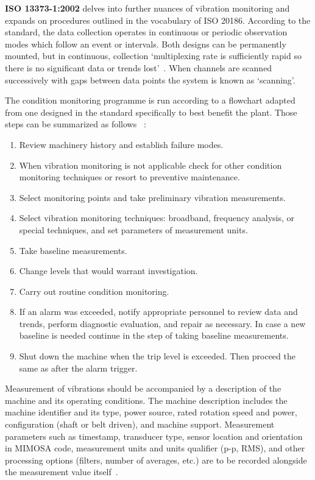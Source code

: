\textbf{ISO 13373-1:2002} delves into further nuances of vibration monitoring and expands on procedures outlined in the vocabulary of ISO 20186. According to the standard, the data collection operates in continuous or periodic observation modes which follow an event or intervals. Both designs can be permanently mounted, but in continuous, collection `multiplexing rate is sufficiently rapid so there is no significant data or trends lost'~\cite{noauthor_iso_2002}.  When channels are scanned successively with gaps between data points the system is known as `scanning'.

The condition monitoring programme is run according to a flowchart adapted from one designed in the standard specifically to best benefit the plant. Those steps can be summarized as follows ~\cite{noauthor_iso_2002}:
\begin{enumerate}
\itemsep0pt
\item Review machinery history and establish failure modes.
\item When vibration monitoring is not applicable check for other condition monitoring techniques or resort to preventive maintenance.
\item Select monitoring points and take preliminary vibration measurements.
\item Select vibration monitoring techniques: broadband, frequency analysis, or special techniques, and set parameters of measurement units.
\item Take baseline measurements.
\item Change levels that would warrant investigation.
\item Carry out routine condition monitoring.
\item If an alarm was exceeded, notify appropriate personnel to review data and trends, perform diagnostic evaluation, and repair as necessary. In case a new baseline is needed continue in the step of taking baseline measurements.
\item Shut down the machine when the trip level is exceeded. Then proceed the same as after the alarm trigger.
\end{enumerate}

Measurement of vibrations should be accompanied by a description of the machine and its operating conditions. The machine description includes the machine identifier and its type, power source, rated rotation speed and power, configuration (shaft or belt driven), and machine support. Measurement parameters such as timestamp, transducer type, sensor location and orientation in MIMOSA code, measurement units and units qualifier (p-p, RMS), and other processing options (filters, number of averages, etc.) are to be recorded alongside the measurement value itself~\cite{noauthor_iso_2002}.

